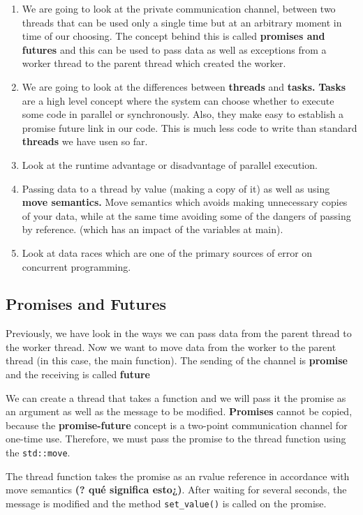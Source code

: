 \documentclass[11pt, a4paper]{article}
\begin{document}
\begin{enumerate}
	\item We are going to look at the private communication channel, between two threads that can be used only a single time but at an arbitrary moment in time of our choosing. The concept behind this is called \textbf{promises and futures} and this can be used to pass data as well as exceptions from a worker thread to the parent thread which created the worker.   
	\item We are going to look at the differences between \textbf{threads} and \textbf{tasks.} \textbf{Tasks} are a high level concept where the system can choose whether to execute some code in parallel or synchronously. Also, they make easy to establish a promise future link in our code. This is much less code to write than standard \textbf{threads} we have usen so far. 
	\item Look at the runtime advantage or disadvantage of parallel execution.
	\item Passing data to a thread by value (making a copy of it) as well as using \textbf{move semantics.} Move semantics which avoids making unnecessary copies of your data, while at the same time avoiding some of the dangers of passing by reference. (which has an impact of the variables at main). 
	\item Look at data races which are one of the primary sources of error on concurrent programming. 
\end{enumerate}


\subsection{Promises and Futures}%
\label{sub:promises_and_futures}

Previously, we have look in the ways we can pass data from the parent thread to the worker thread. Now we want to move data from the worker to the parent thread (in this case, the main function). The sending of the channel is \textbf{promise} and the receiving is called \textbf{future} 


We can create a thread that takes a function and we will pass it the promise as an argument as well as the message to be modified. \textbf{Promises} cannot be copied, because the \textbf{promise-future} concept is a two-point communication channel for one-time use. Therefore, we must pass the promise to the thread function using the \texttt{std::move}. 

The thread function takes the promise as an rvalue reference in accordance with move semantics \textbf{(? qué significa esto¿)}. After waiting for several seconds, the message is modified and the method \texttt{set\_value()} is called on the promise. 
\end{document}
